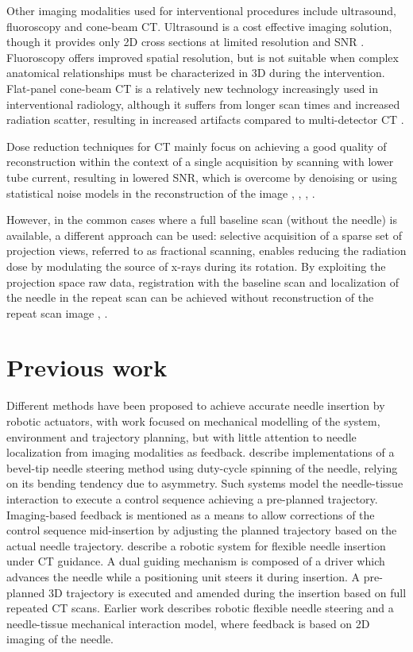 \documentclass[letterpaper, 11 pt, conference]{ieeeconf}  %
\begin{document}
Other imaging modalities used for interventional procedures include ultrasound, fluoroscopy and cone-beam CT.
Ultrasound is a cost effective imaging solution, though it provides only 2D cross sections at limited resolution and SNR \cite{sheafor2000comparison}.
Fluoroscopy offers improved spatial resolution, but is not suitable when complex anatomical relationships must be characterized in 3D during the intervention.
Flat-panel cone-beam CT is a relatively new technology increasingly used in interventional radiology, although it suffers from longer scan times and increased radiation scatter, resulting in increased artifacts compared to multi-detector CT \cite{orth2008cbct}.

Dose reduction techniques for CT mainly focus on achieving a good quality of reconstruction within the context of a single acquisition by scanning with lower tube current, resulting in lowered SNR, which is overcome by denoising \cite{manduca2009projection} or using statistical noise models in the reconstruction of the image \cite{zhang2016statistical}, \cite{kim2015sparseview}, \cite{niu2014sparse}, \cite{liu2014total}. 

However, in the common cases where a full baseline scan (without the needle) is available, a different approach can be used:
selective acquisition of a sparse set of projection views, referred to as fractional scanning, enables reducing the radiation dose by modulating the source of x-rays during its rotation. By exploiting the projection space raw data, registration with the baseline scan and localization of the needle in the repeat scan can be achieved without reconstruction of the repeat scan image \cite{medan2017sparse}, \cite{medan2017reduced}.

\section{Previous work}
Different methods have been proposed to achieve accurate needle insertion by robotic actuators, with work focused on mechanical modelling of the system, environment and trajectory planning, but with little attention to needle localization from imaging modalities as feedback.
\cite{wu2013automatic} \cite{engh2010percutaneous} describe implementations of a bevel-tip needle steering method using duty-cycle spinning of the needle, relying on its bending tendency due to asymmetry. Such systems model the needle-tissue interaction to execute a control sequence achieving a pre-planned trajectory. Imaging-based feedback is mentioned as a means to allow corrections of the control sequence mid-insertion by adjusting the planned trajectory based on the actual needle trajectory.
\cite{ben2018robotic} describe a robotic system for flexible needle insertion under CT guidance. A dual guiding mechanism is composed of a driver which advances the needle while a positioning unit steers it during insertion. A pre-planned 3D trajectory is executed and amended during the insertion based on full repeated CT scans.
Earlier work \cite{glozman2007image} describes robotic flexible needle steering and a needle-tissue mechanical interaction model, where feedback is based on 2D imaging of the needle.
\end{document}
